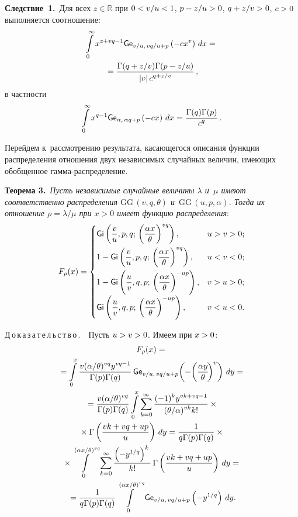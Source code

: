 \begin{multicols}{2}
\bigskip

\noindent
\textbf{Следствие~1.}\
Для всех $z\in\mathbb{R}$ при $0\hm<v/u\hm<1$, $p-z/u\hm>0$, $q+z/v\hm>0$, $c\hm>0$ выполняется 
соотношение:
\begin{multline*}
\int\limits_0^\infty x^{z+vq-1}{\sf Ge}_{v/u,\, vq/u+p}\left(-c x^{v}\right)\,dx={}\\
{}=
\fr{\Gamma(q+z/v)\Gamma(p-z/u)}{\abs{v}c^{q+z/v}}\,,
\end{multline*}
в частности
$$
\int\limits_0^\infty x^{q-1}{\sf Ge}_{\alpha,\, \alpha q+p}\left(-c x\right)\,dx=
\fr{\Gamma(q)\Gamma(p)}{c^{q}}\,.
$$


\smallskip

Перейдем к~рассмотрению результата, касающегося описания функции распределения 
отношения двух независимых случайных величин, имеющих обобщенное гамма-распределение.

\bigskip

\noindent
\textbf{Теорема 3.}\
\textit{Пусть независимые случайные величины $\lambda$ и~$\mu$ имеют соответственно 
распределения $\mathrm{GG}\,(v,q,\theta)$ и~$\mathrm{GG}\,(u,p,\alpha)$. Тогда их отношение 
$\rho=\lambda/\mu$ при $x>0$ имеет функцию распределения}:
$$
F_{\rho}(x) =
 \begin{cases}
   \displaystyle {\sf Gi}\left(\fr{v}{u},p,q;\,\left(\fr{\alpha x}{\theta}\right)^{vq}\right), 
&u>v>0;\\[9pt]
   \displaystyle 1-{\sf Gi}\left(\fr{v}{u},p,q;\,\left(\fr{\alpha x}{\theta}\right)^{vq}\right), 
&u<v<0;\\[9pt]
   \displaystyle 1-{\sf Gi}\left(\fr{u}{v},q,p;\,\left(\fr{\alpha x}{\theta}\right)^{-up}\right), 
&v>u>0;\\[9pt]
   \displaystyle {\sf Gi}\left(\fr{u}{v},q,p;\,\left(\fr{\alpha x}{\theta}\right)^{-up}\right), 
&v<u<0.
 \end{cases}
$$


\noindent
Д\,о\,к\,а\,з\,а\,т\,е\,л\,ь\,с\,т\,в\,о\,.\ \ Пусть $u\hm>v\hm>0$. Имеем при $x\hm>0$:
\begin{multline*}
F_\rho(x)={}\\
{}=\int\limits_0^x
\fr{{v}(\alpha/\theta)^{vq}y^{vq-1}}{\Gamma(p)\Gamma(q)}\,{\sf Ge}_{v/u,\, 
vq/u+p}\!\left(-\!\left(\fr{\alpha y}{\theta}\!\right)^{v}\right)
\, dy={}\\
{}=\fr{{v}(\alpha/\theta)^{vq}}{\Gamma(p)\Gamma(q)}\int\limits_0^x
\sum\limits_{k=0}^{\infty}\fr{(-1)^ky^{vk+vq-1}}{(\theta/\alpha)^{vk}k!} \times{}\\
{}\times
\Gamma\left(\fr{ vk + vq+up}{u}\right)
\, dy=\fr{1}{q\Gamma(p)\Gamma(q)}\times{}\\
{}\times \int\limits_0^{(\alpha x/\theta)^{vq}}
\sum\limits_{k=0}^{\infty}\fr{\left(-y^{1/q}\right)^{k}}{k!} \,
\Gamma\left(\fr{ vk + vq+up}{u}\right)
\, {dy}={}\\
{}=\fr{1}{q\Gamma(p)\Gamma(q)}\int\limits_0^{(\alpha x/\theta)^{vq}}
{\sf Ge}_{v/u,\,vq/u+p}\left(-y^{1/q}\right)\, {dy}.
\end{multline*}


\end{multicols}
